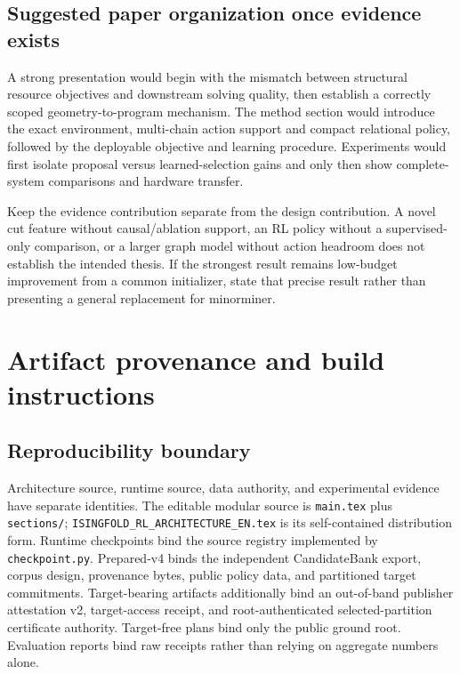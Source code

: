 \documentclass[11pt,a4paper]{article}
\newcommand{\code}[1]{\texttt{\small #1}}
\theoremstyle{definition}\newtheorem{definition}[proposition]{Definition}
\begin{document}
\subsection{Suggested paper organization once evidence exists}
A strong presentation would begin with the mismatch between structural resource objectives and downstream solving quality, then establish a correctly scoped geometry-to-program mechanism. The method section would introduce the exact environment, multi-chain action support and compact relational policy, followed by the deployable objective and learning procedure. Experiments would first isolate proposal versus learned-selection gains and only then show complete-system comparisons and hardware transfer.

Keep the evidence contribution separate from the design contribution. A novel cut feature without causal/ablation support, an RL policy without a supervised-only comparison, or a larger graph model without action headroom does not establish the intended thesis. If the strongest result remains low-budget improvement from a common initializer, state that precise result rather than presenting a general replacement for minorminer.
 \clearpage\appendix\section{Artifact provenance and build instructions}\label{app:provenance}
\subsection{Reproducibility boundary}
Architecture source, runtime source, data authority, and experimental evidence have separate identities. The editable modular source is \code{main.tex} plus \code{sections/}; \code{ISINGFOLD\_RL\_ARCHITECTURE\_EN.tex} is its self-contained distribution form. Runtime checkpoints bind the source registry implemented by \code{checkpoint.py}. Prepared-v4 binds the independent CandidateBank export, corpus design, provenance bytes, public policy data, and partitioned target commitments. Target-bearing artifacts additionally bind an out-of-band publisher attestation v2, target-access receipt, and root-authenticated selected-partition certificate authority. Target-free plans bind only the public ground root. Evaluation reports bind raw receipts rather than relying on aggregate numbers alone.
\end{document}
